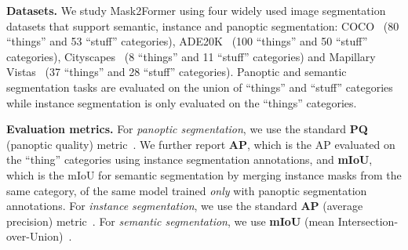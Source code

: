 \documentclass[10pt,twocolumn,letterpaper]{article}
\newcommand{\modelname}{Mask2Former\xspace}
\begin{document}
\noindent\textbf{Datasets.}
We study \modelname using four widely used image segmentation datasets that support semantic, instance and panoptic segmentation:
COCO~\cite{lin2014coco} (80 ``things'' and 53 ``stuff'' categories), ADE20K~\cite{zhou2017ade20k} (100 ``things'' and 50 ``stuff'' categories), Cityscapes~\cite{Cordts2016Cityscapes} (8 ``things'' and 11 ``stuff'' categories) and Mapillary Vistas~\cite{neuhold2017mapillary} (37 ``things'' and 28 ``stuff'' categories). Panoptic and semantic segmentation tasks are evaluated on the union of ``things'' and ``stuff'' categories while instance segmentation is only evaluated on the ``things'' categories.

\noindent\textbf{Evaluation metrics.}
For \emph{panoptic segmentation}, we use the standard \textbf{PQ} (panoptic quality) metric~\cite{kirillov2017panoptic}. We further report \textbf{AP}, which is the AP evaluated on the ``thing'' categories using instance segmentation annotations, and \textbf{mIoU}, which is the mIoU for semantic segmentation by merging instance masks from the same category, of the same model trained \emph{only} with panoptic segmentation annotations. For \emph{instance segmentation}, we use the standard \textbf{AP} (average precision) metric~\cite{lin2014coco}. For \emph{semantic segmentation}, we use \textbf{mIoU} (mean Intersection-over-Union)~\cite{everingham2015pascal}.
\end{document}

